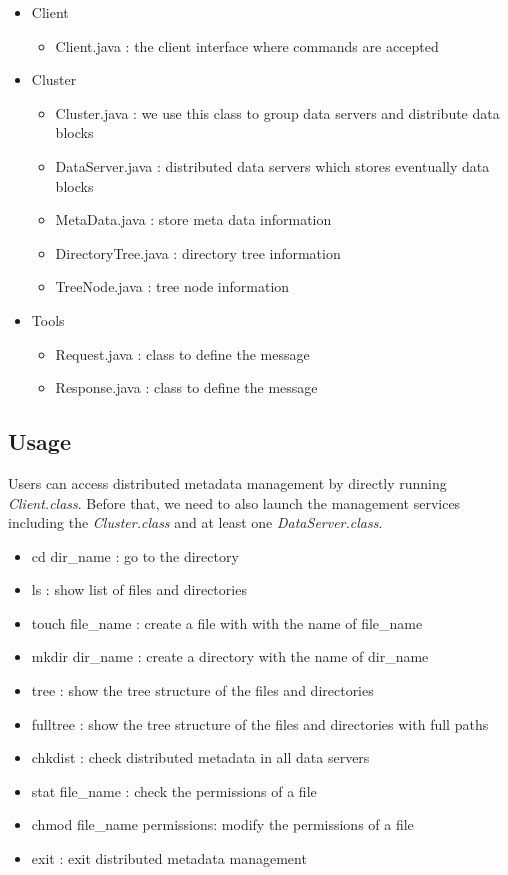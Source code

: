 \documentclass[10pt]{article}
\begin{document}
\begin{itemize}
  \item Client
  \begin{itemize}
    \item Client.java : the client interface where commands are accepted
  \end{itemize}
  \item Cluster
  \begin{itemize}
    \item Cluster.java : we use this class to group data servers and distribute data blocks
    \item DataServer.java : distributed data servers which stores  eventually data blocks
    \item MetaData.java : store meta data information
    \item DirectoryTree.java : directory tree information
    \item TreeNode.java : tree node information
  \end{itemize}
  \item Tools
  \begin{itemize}
    \item Request.java : class to define the message
    \item Response.java : class to define the message
  \end{itemize}
\end{itemize}

\subsection{Usage}

Users can access distributed metadata management by directly running \textit{Client.class}. Before that, we need 
to also launch the management services including the \textit{Cluster.class} and at least one \textit{DataServer.class}.

\begin{itemize}
  \item cd dir\_name : go to the directory
  \item ls : show list of files and directories
  \item touch file\_name : create a file with with the name of file\_name
  \item mkdir dir\_name : create a directory with the name of dir\_name
  \item tree : show the tree structure of the files and directories
  \item fulltree : show the tree structure of the files and directories with full paths
  \item chkdist : check distributed metadata in all data servers
  \item stat file\_name : check the permissions of a file
  \item chmod file\_name permissions: modify the permissions of a file
  \item exit : exit distributed metadata management
\end{itemize}
\end{document}
